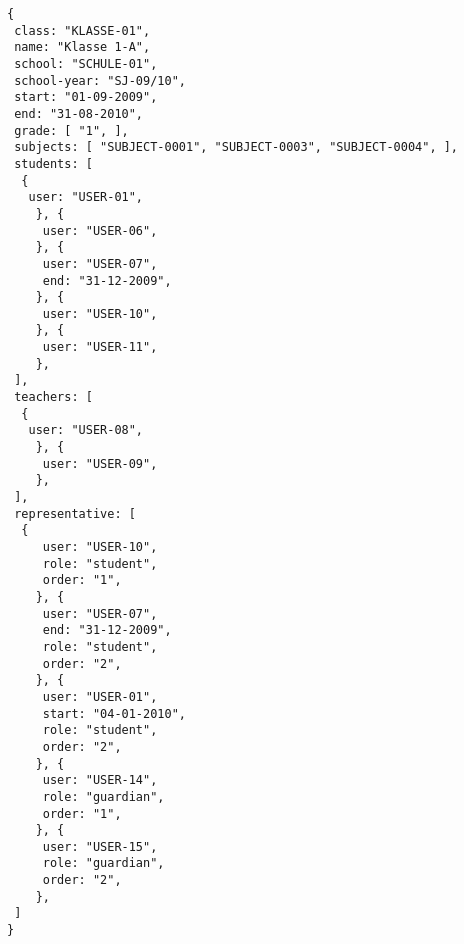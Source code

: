 
\begin{lstlisting}[caption={Klassendatenmodel Beispiel 2: Grundschulklasse},frame=tlrb]
{
 class: "KLASSE-01",
 name: "Klasse 1-A",
 school: "SCHULE-01",
 school-year: "SJ-09/10",
 start: "01-09-2009",
 end: "31-08-2010",
 grade: [ "1", ],
 subjects: [ "SUBJECT-0001", "SUBJECT-0003", "SUBJECT-0004", ],
 students: [
  { 
   user: "USER-01",
	}, { 
	 user: "USER-06",
	}, { 
	 user: "USER-07",
	 end: "31-12-2009",
	}, { 
	 user: "USER-10",
	}, { 
	 user: "USER-11",
	},
 ],
 teachers: [
  { 
   user: "USER-08",
	}, { 
	 user: "USER-09",
	},
 ],
 representative: [
  {
	 user: "USER-10",
	 role: "student",
	 order: "1",	 
	}, {
	 user: "USER-07",
	 end: "31-12-2009",
	 role: "student",
	 order: "2",	 
	}, {
	 user: "USER-01",
	 start: "04-01-2010",
	 role: "student",
	 order: "2",	 
	}, {
	 user: "USER-14",
	 role: "guardian",
	 order: "1",	 
	}, {
	 user: "USER-15",
	 role: "guardian",
	 order: "2",	 
	},  
 ]
}
\end{lstlisting}